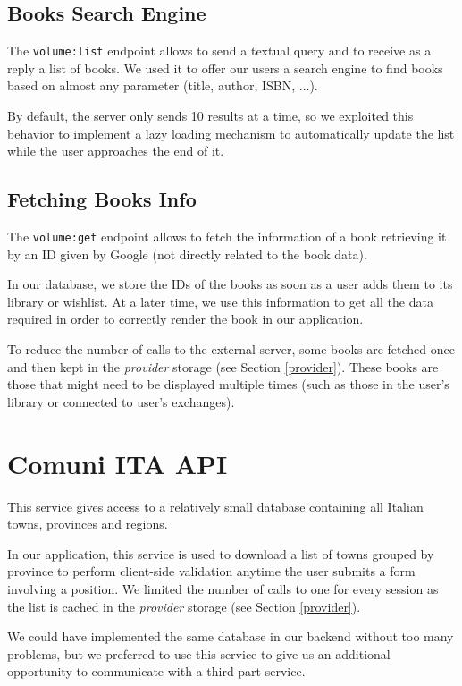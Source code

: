 \subsection{Books Search Engine}
The \texttt{volume:list} endpoint allows to send a textual query and to receive as a reply a list of books.
We used it to offer our users a search engine to find books based on almost any parameter (title, author, ISBN, ...).

By default, the server only sends 10 results at a time, so we exploited this behavior to implement a lazy loading mechanism to automatically update the list while the user approaches the end of it.

\clearpage
\subsection{Fetching Books Info}
The \texttt{volume:get} endpoint allows to fetch the information of a book retrieving it by an ID given by Google (not directly related to the book data).

In our database, we store the IDs of the books as soon as a user adds them to its library or wishlist.
At a later time, we use this information to get all the data required in order to correctly render the book in our application.

To reduce the number of calls to the external server, some books are fetched once and then kept in the \emph{provider} storage (see Section \ref{provider}).
These books are those that might need to be displayed multiple times (such as those in the user's library or connected to user's exchanges).

\section{Comuni ITA API}
This service gives access to a relatively small database containing all Italian towns, provinces and regions.

In our application, this service is used to download a list of towns grouped by province to perform client-side validation anytime the user submits a form involving a position.
We limited the number of calls to one for every session as the list is cached in the \emph{provider} storage (see Section \ref{provider}).

We could have implemented the same database in our backend without too many problems, but we preferred to use this service to give us an additional opportunity to communicate with a third-part service. 

